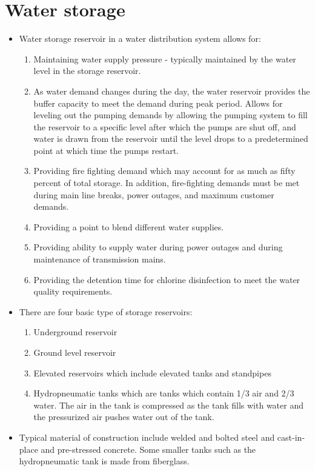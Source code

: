 \section{Water storage}
\begin{itemize}
\item Water  storage reservoir in a water distribution system allows for:
\begin{enumerate}
\item Maintaining water supply pressure - typically maintained by the water level in the storage reservoir.
\item As water demand changes during the day, the water reservoir provides the buffer capacity to meet the demand during peak period.  Allows for leveling out the pumping demands by allowing the pumping system to fill the reservoir to a specific level after which the pumps are shut off, and water is drawn from the reservoir until the level drops to a predetermined point at which time the pumps restart.
\item Providing fire fighting demand which may account for as much as fifty percent of total storage. In addition, fire-fighting demands must be met during main line breaks, power outages, and maximum customer demands.
\item Providing a point to blend different water supplies.
\item Providing ability to supply water during power outages and during maintenance of transmission mains.
\item Providing the detention time for chlorine disinfection to meet the water quality requirements.
\end{enumerate}
\item There are four basic type of storage reservoirs: 
\begin{enumerate}
\item Underground reservoir
\item Ground level reservoir
\item Elevated reservoirs which include elevated tanks and standpipes
\item Hydropneumatic tanks which are tanks which contain 1/3 air and 2/3 water.  The air in the tank is compressed as the tank fills with water and the pressurized air pushes water out of the tank.
\end{enumerate}
\item Typical material of construction include welded and bolted steel and cast-in-place and pre-stressed concrete.  Some smaller tanks such as the hydropneumatic tank is made from fiberglass.

\end{itemize}
